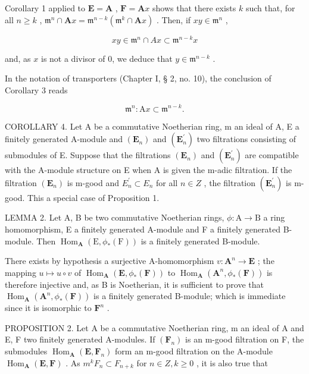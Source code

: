 Corollary 1 applied to \(\mathbf{E} = \mathbf{A}\) , \(\mathbf{F} = \mathbf{A}x\) shows that there exists \(k\) such that, for all \(n \geqslant k\) , \(\mathfrak{m}^n \cap \mathbf{A}x = \mathfrak{m}^{n - k}(\mathfrak{m}^k \cap \mathbf{A}x)\) . Then, if \(xy \in \mathfrak{m}^n\) ,

\[
x y \in \mathfrak {m} ^ {n} \cap A x \subset \mathfrak {m} ^ {n - k} x
\]

and, as \(x\) is not a divisor of 0, we deduce that \(y \in \mathfrak{m}^{n - k}\) .

In the notation of transporters (Chapter I, § 2, no. 10), the conclusion of Corollary 3 reads

\[
\mathfrak {m} ^ {n}: \mathrm{A} x \subset \mathfrak {m} ^ {n - k}.\tag{2}
\]

COROLLARY 4. Let A be a commutative Noetherian ring, m an ideal of A, E a finitely generated A-module and \((\mathbf{E}_{n})\) and \((\mathbf{E}_{n}^{\prime})\) two filtrations consisting of submodules of E. Suppose that the filtrations \((\mathbf{E}_{n})\) and \((\mathbf{E}_{n}^{\prime})\) are compatible with the A-module structure on E when A is given the m-adic filtration. If the filtration \((\mathbf{E}_{n})\) is m-good and \(E_{n}^{\prime} \subset E_{n}\) for all \(n \in Z\) , the filtration \((\mathbf{E}_{n}^{\prime})\) is m-good. This a special case of Proposition 1.

LEMMA 2. Let A, B be two commutative Noetherian rings, \(\phi: \mathrm{A} \to \mathrm{B}\) a ring homomorphism, E a finitely generated A-module and F a finitely generated B-module. Then \(\operatorname{Hom}_{\mathbf{A}}(\mathrm{E}, \phi_*(\mathrm{F}))\) is a finitely generated B-module.

There exists by hypothesis a surjective A-homomorphism \(v: \mathbf{A}^n \to \mathbf{E}\) ; the mapping \(u \mapsto u \circ v\) of \(\operatorname{Hom}_{\mathbf{A}}(\mathbf{E}, \phi_*(\mathbf{F}))\) to \(\operatorname{Hom}_{\mathbf{A}}(\mathbf{A}^n, \phi_*(\mathbf{F}))\) is therefore injective and, as B is Noetherian, it is sufficient to prove that \(\operatorname{Hom}_{\mathbf{A}}(\mathbf{A}^n, \phi_*(\mathbf{F}))\) is a finitely generated B-module; which is immediate since it is isomorphic to \(\mathbf{F}^n\) .

PROPOSITION 2. Let A be a commutative Noetherian ring, m an ideal of A and E, F two finitely generated A-modules. If \((\mathbf{F}_{n})\) is an m-good filtration on F, the submodules \(\operatorname{Hom}_{\mathbf{A}}(\mathbf{E}, \mathbf{F}_{n})\) form an m-good filtration on the A-module \(\operatorname{Hom}_{\mathbf{A}}(\mathbf{E}, \mathbf{F})\) . As \(m^{k}F_{n}\subset F_{n+k}\) for \(n\in Z, k\geqslant0\) , it is also true that


